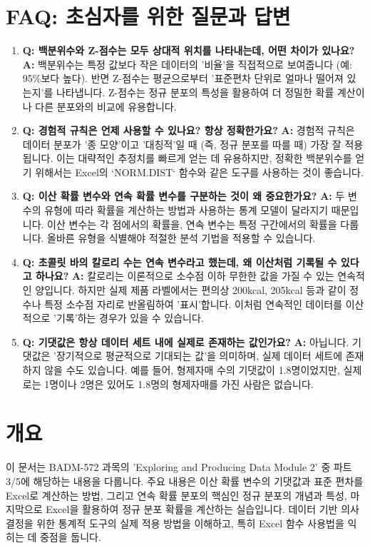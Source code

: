 \documentclass[11pt,a4paper]{article}
\begin{document}
\newpage
\section{FAQ: 초심자를 위한 질문과 답변}

\begin{enumerate}
    \item \textbf{Q: 백분위수와 Z-점수는 모두 상대적 위치를 나타내는데, 어떤 차이가 있나요?}
    \textbf{A:} 백분위수는 특정 값보다 작은 데이터의 '비율'을 직접적으로 보여줍니다 (예: 95\%보다 높다). 반면 Z-점수는 평균으로부터 '표준편차 단위로 얼마나 떨어져 있는지'를 나타냅니다. Z-점수는 정규 분포의 특성을 활용하여 더 정밀한 확률 계산이나 다른 분포와의 비교에 유용합니다.

    \item \textbf{Q: 경험적 규칙은 언제 사용할 수 있나요? 항상 정확한가요?}
    \textbf{A:} 경험적 규칙은 데이터 분포가 '종 모양'이고 '대칭적'일 때 (즉, 정규 분포를 따를 때) 가장 잘 적용됩니다. 이는 대략적인 추정치를 빠르게 얻는 데 유용하지만, 정확한 백분위수를 얻기 위해서는 Excel의 `NORM.DIST` 함수와 같은 도구를 사용하는 것이 좋습니다.

    \item \textbf{Q: 이산 확률 변수와 연속 확률 변수를 구분하는 것이 왜 중요한가요?}
    \textbf{A:} 두 변수의 유형에 따라 확률을 계산하는 방법과 사용하는 통계 모델이 달라지기 때문입니다. 이산 변수는 각 점에서의 확률을, 연속 변수는 특정 구간에서의 확률을 다룹니다. 올바른 유형을 식별해야 적절한 분석 기법을 적용할 수 있습니다.

    \item \textbf{Q: 초콜릿 바의 칼로리 수는 연속 변수라고 했는데, 왜 이산처럼 기록될 수 있다고 하나요?}
    \textbf{A:} 칼로리는 이론적으로 소수점 이하 무한한 값을 가질 수 있는 연속적인 양입니다. 하지만 실제 제품 라벨에서는 편의상 200kcal, 205kcal 등과 같이 정수나 특정 소수점 자리로 반올림하여 '표시'합니다. 이처럼 연속적인 데이터를 이산적으로 '기록'하는 경우가 있을 수 있습니다.

    \item \textbf{Q: 기댓값은 항상 데이터 세트 내에 실제로 존재하는 값인가요?}
    \textbf{A:} 아닙니다. 기댓값은 '장기적으로 평균적으로 기대되는 값'을 의미하며, 실제 데이터 세트에 존재하지 않을 수도 있습니다. 예를 들어, 형제자매 수의 기댓값이 1.8명이었지만, 실제로는 1명이나 2명은 있어도 1.8명의 형제자매를 가진 사람은 없습니다.
\end{enumerate}

\newpage

\newpage
\section*{개요}
이 문서는 BADM-572 과목의 'Exploring and Producing Data Module 2' 중 파트 3/5에 해당하는 내용을 다룹니다.
주요 내용은 이산 확률 변수의 기댓값과 표준 편차를 Excel로 계산하는 방법, 그리고 연속 확률 분포의 핵심인 정규 분포의 개념과 특성, 마지막으로 Excel을 활용하여 정규 분포 확률을 계산하는 실습입니다.
데이터 기반 의사 결정을 위한 통계적 도구의 실제 적용 방법을 이해하고, 특히 Excel 함수 사용법을 익히는 데 중점을 둡니다.
\end{document}
